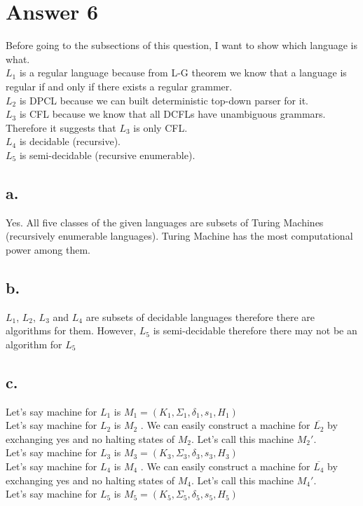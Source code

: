\documentclass[12pt]{article}
\begin{document}
\section*{Answer 6}
Before going to the subsections of this question, I want to show which language is what. \\
$L_1$ is a regular language because from L-G theorem we know that a language is regular if and only if there exists a regular grammer. \\
$L_2$ is DPCL because we can built deterministic top-down parser for it. \\
$L_3$ is CFL because we know that all DCFLs have unambiguous grammars. Therefore it suggests that $L_3$ is only CFL. \\
$L_4$ is decidable (recursive).\\
$L_5$ is semi-decidable (recursive enumerable).\\
\subsection*{a.}
Yes. All five classes of the given languages are subsets of Turing Machines (recursively enumerable languages). Turing Machine has the most computational power among them. \\
\subsection*{b.}
$L_1$, $L_2$, $L_3$ and $L_4$ are subsets of decidable languages therefore there are algorithms for them. However, $L_5$ is semi-decidable therefore there may not be an algorithm for $L_5$ \\
\subsection*{c.}



Let's say machine for $L_1$ is $M_1=(K_1,\Sigma_1,\delta_1,s_1,H_1)$ \\
Let's say machine for $L_2$ is $M_2$ . We can easily construct a machine for $\overline{L_2}$ by exchanging yes and no halting states of $M_2$. Let's call this machine $M_2'$. \\
Let's say machine for $L_3$ is $M_3=(K_3,\Sigma_3,\delta_3,s_3,H_3)$ \\ 
Let's say machine for $L_4$ is $M_4$ . We can easily construct a machine for $\overline{L_4}$ by exchanging yes and no halting states of $M_4$. Let's call this machine $M_4'$. \\
Let's say machine for $L_5$ is $M_5=(K_5,\Sigma_5,\delta_5,s_5,H_5)$ \\
\end{document}
